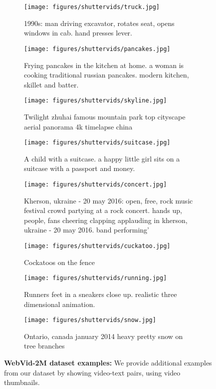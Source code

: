 \documentclass[10pt,twocolumn,letterpaper]{article}
\begin{document}
\begin{figure*}[t]
\captionsetup[subfigure]{labelformat=empty}
     \centering
     \begin{subfigure}[t]{0.21\textwidth}
         \centering
         \texttt{[image: figures/shuttervids/truck.jpg]}
         \caption{1990s: man driving excavator, rotates seat, opens windows in cab. hand presses lever.}
     \end{subfigure} \hfill
     \begin{subfigure}[t]{0.21\textwidth}
         \centering
         \texttt{[image: figures/shuttervids/pancakes.jpg]}
         \caption{\footnotesize{Frying pancakes in the kitchen at home. a woman is cooking traditional russian pancakes. modern kitchen, skillet and batter.}}
         \label{fig:threesinx1}
     \end{subfigure} \hfill
     \begin{subfigure}[t]{0.21\textwidth}
         \centering
         \texttt{[image: figures/shuttervids/skyline.jpg]}
         \caption{Twilight zhuhai famous mountain park top cityscape aerial panorama 4k timelapse china}
     \end{subfigure} \hfill
          \begin{subfigure}[t]{0.21\textwidth}
         \centering
         \texttt{[image: figures/shuttervids/suitcase.jpg]}
         \caption{A child with a suitcase. a happy little girl sits on a suitcase with a passport and money.}
     \end{subfigure} \hfill 
     \begin{subfigure}[t]{0.21\textwidth}
         \centering
         \texttt{[image: figures/shuttervids/concert.jpg]}
         \caption{\tiny{Kherson, ukraine - 20 may 2016: open, free, rock music festival crowd partying at a rock concert. hands up, people, fans cheering clapping applauding in kherson, ukraine - 20 may 2016. band performing'}}
         \label{fig:threesinx2}
     \end{subfigure} \hfill
     \begin{subfigure}[t]{0.21\textwidth}
         \centering
         \texttt{[image: figures/shuttervids/cuckatoo.jpg]}
         \caption{Cockatoos on the fence}
     \end{subfigure} \hfill
          \begin{subfigure}[t]{0.21\textwidth}
         \centering
         \texttt{[image: figures/shuttervids/running.jpg]}
         \caption{Runners feet in a sneakers close up. realistic three dimensional animation.}
     \end{subfigure} \hfill
     \begin{subfigure}[t]{0.21\textwidth}
         \centering
         \texttt{[image: figures/shuttervids/snow.jpg]}
         \caption{Ontario, canada january 2014 heavy pretty snow on tree branches}
         \label{fig:threesinx3}
     \end{subfigure} \hfill
        \caption{\textbf{WebVid-2M dataset examples:} We provide additional
        examples from our dataset by showing video-text pairs, using video thumbnails.}
        \label{fig:dataset_qual}
\end{figure*} 
\end{document}
